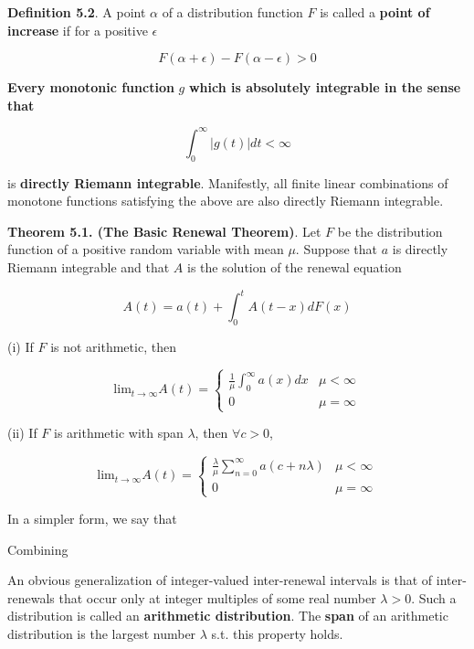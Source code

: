 \documentclass[12pt]{article}
\theoremstyle{nonumberbreak}
\begin{document}
\begin{theorem}
\textbf{Definition 5.2}. A point $\alpha$ of a distribution function $F$ is called a \textbf{point of increase} if for a positive $\epsilon$  

$$
F(\alpha + \epsilon) - F(\alpha - \epsilon) > 0
$$
\end{theorem}

\textbf{Every monotonic function} $g$ \textbf{which is absolutely integrable in the sense that}

$$
\int_0^\infty |g(t)| dt < \infty
$$ 

is \textbf{directly Riemann integrable}. Manifestly, all finite linear combinations of monotone functions satisfying the above are also directly Riemann integrable. 


\begin{theorem}
\textbf{Theorem 5.1. (The Basic Renewal Theorem)}. Let $F$ be the distribution function of a positive random variable with mean $\mu$. Suppose that $a$ is directly Riemann integrable and that $A$ is the solution of the renewal equation

$$
A(t) = a(t) + \int_0^t A(t-x) dF(x)
$$

(i) If $F$ is not arithmetic, then 

$$
\mathrm{lim}_{t\to\infty} A(t) = \begin{cases}
\frac{1}{\mu} \int_0^\infty a(x) dx & \mu < \infty \\
0 & \mu = \infty
\end{cases}
$$

(ii) If $F$ is arithmetic with span $\lambda$, then $\forall c>0$, 

$$
\mathrm{lim}_{t\to\infty} A(t) = \begin{cases}
\frac{\lambda}{\mu} \sum_{n=0}^\infty a(c + n\lambda) & \mu < \infty \\
0 & \mu = \infty
\end{cases}
$$
\end{theorem}

In a simpler form, we say that







Combining 



An obvious generalization of integer-valued inter-renewal intervals is that of inter-renewals that occur only at integer multiples of some real number $\lambda >0$. Such a distribution is called an \textbf{arithmetic distribution}. The \textbf{span} of an arithmetic distribution is the largest number $\lambda$ s.t. this property holds. 
\end{document}
